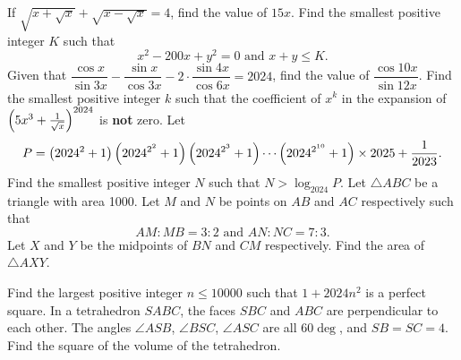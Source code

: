 \begin{enumerate}
    \setcounter{enumi}{5}
    \hyperrefitem[A::2024-S-1-6] If $\sqrt{x + \sqrt{x}} + \sqrt{x - \sqrt{x}} = 4$, find the value of $15x$.
    \hyperrefitem[A::2024-S-1-7] Find the smallest positive integer $K$ such that \[x^2 - 200x + y^2 = 0 \text{ and } x + y \leq K.\]
    \hyperrefitem[A::2024-S-1-8] Given that $\dfrac{\cos{x}}{\sin{3x}} - \dfrac{\sin{x}}{\cos{3x}} - 2 \cdot \dfrac{\sin{4x}}{\cos{6x}} = 2024$, find the value of $\dfrac{\cos{10x}}{\sin{12x}}$.
    \hyperrefitem[A::2024-S-1-9] Find the smallest positive integer $k$ such that the coefficient of $x^k$ in the expansion of $\left( 5x^3 + \frac1{\sqrt{x}} \right)^{2024}$ is \textbf{not} zero.
    \hyperrefitem[A::2024-S-1-10] Let \[P = \left( 2024^2 + 1 \right)\left( 2024^{2^2} + 1 \right)\left( 2024^{2^3} + 1 \right)\cdots\left( 2024^{2^{10}} + 1 \right) \times 2025 + \dfrac1{2023}.\] Find the smallest positive integer $N$ such that $N > \log_{2024} P$.
    \hyperrefitem[A::2024-S-1-11] Let $\triangle ABC$ be a triangle with area 1000. Let $M$ and $N$ be points on $AB$ and $AC$ respectively such that \[AM : MB = 3 : 2 \text{ and } AN : NC = 7 : 3.\] Let $X$ and $Y$ be the midpoints of $BN$ and $CM$ respectively. Find the area of $\triangle AXY$.

    \begin{center}
    \end{center}
    \hyperrefitem[A::2024-S-1-12] Find the largest positive integer $n \leq 10000$ such that $1 + 2024n^2$ is a perfect square.
    \hyperrefitem[A::2024-S-1-13] In a tetrahedron $SABC$, the faces $SBC$ and $ABC$ are perpendicular to each other. The angles $\angle ASB$, $\angle BSC$, $\angle ASC$ are all $60\deg$, and $SB = SC = 4$. Find the square of the volume of the tetrahedron.


\end{enumerate}
